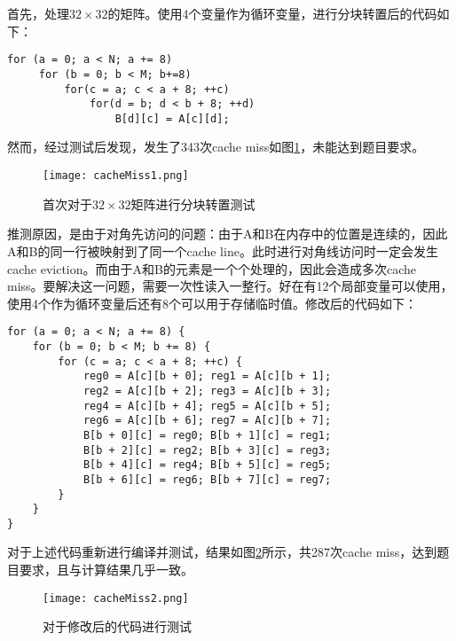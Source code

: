 \par 首先，处理$32\times 32$的矩阵。使用4个变量作为循环变量，进行分块转置后的代码如下：

\begin{lstlisting}
for (a = 0; a < N; a += 8)
     for (b = 0; b < M; b+=8)
         for(c = a; c < a + 8; ++c)
             for(d = b; d < b + 8; ++d)
                 B[d][c] = A[c][d];
\end{lstlisting}

\par 然而，经过测试后发现，发生了343次cache miss如图\ref{fig:cacheMiss1}，未能达到题目要求。
\begin{figure}[htb]
    \centering
    \texttt{[image: cacheMiss1.png]}
    \caption{首次对于$32\times 32$矩阵进行分块转置测试}
    \label{fig:cacheMiss1}
\end{figure}

\par 推测原因，是由于对角先访问的问题：由于A和B在内存中的位置是连续的，因此A和B的同一行被映射到了同一个cache line。此时进行对角线访问时一定会发生cache eviction。而由于A和B的元素是一个个处理的，因此会造成多次cache miss。要解决这一问题，需要一次性读入一整行。好在有12个局部变量可以使用，使用4个作为循环变量后还有8个可以用于存储临时值。修改后的代码如下：

\begin{lstlisting}
for (a = 0; a < N; a += 8) {
    for (b = 0; b < M; b += 8) {
        for (c = a; c < a + 8; ++c) {
            reg0 = A[c][b + 0]; reg1 = A[c][b + 1];
            reg2 = A[c][b + 2]; reg3 = A[c][b + 3];
            reg4 = A[c][b + 4]; reg5 = A[c][b + 5];
            reg6 = A[c][b + 6]; reg7 = A[c][b + 7];
            B[b + 0][c] = reg0; B[b + 1][c] = reg1;
            B[b + 2][c] = reg2; B[b + 3][c] = reg3;
            B[b + 4][c] = reg4; B[b + 5][c] = reg5;
            B[b + 6][c] = reg6; B[b + 7][c] = reg7;
        }
    }
}
\end{lstlisting}

\par 对于上述代码重新进行编译并测试，结果如图\ref{fig:cacheMiss2}所示，共287次cache miss，达到题目要求，且与计算结果几乎一致。
\begin{figure}[htb]
    \centering
    \texttt{[image: cacheMiss2.png]}
    \caption{对于修改后的代码进行测试}
    \label{fig:cacheMiss2}
\end{figure}

